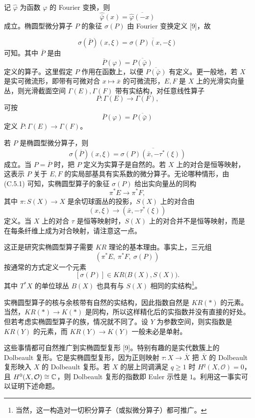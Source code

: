 记 $\hat\varphi$ 为函数 $\varphi$ 的 Fourier 变换，则
\[
  \widehat{\bar\varphi}(x)=\overline{\hat\varphi(-x)}
\]
成立。椭圆型微分算子 $P$ 的象征 $\sigma(P)$ 由 Fourier 变换定义 [9]，故

\[
  \sigma(\overline{P})(x,\xi)=\overline{\sigma(P)(x,-\xi)}
\]
可知。其中 $\overline{P}$ 是由
\[
  \overline{P}(\varphi)=\overline{P(\bar\varphi)}
\]
定义的算子。这里假定 $P$ 作用在函数上，以便 $\overline{P(\bar\varphi)}$ 有定义。更一般地，若 $X$ 是实可微流形，即带有可微对合 $x\mapsto\bar x$ 的可微流形，$E,F$ 是 $X$ 上的光滑实向量丛，则光滑截面空间 $\Gamma(E),\Gamma(F)$ 带有实结构，对任意线性算子
\[
  P\colon\Gamma(E)\to\Gamma(F),
\]
可按
\[
  \overline{P}(\varphi)=\overline{P(\bar\varphi)}
\]
定义 $\overline{P}\colon\Gamma(E)\to\Gamma(F)$。

若 $P$ 是椭圆型微分算子，则
\begin{equation}
  \sigma(\overline{P})(x,\xi)=\overline{\sigma(P)(\bar x,-\tau^{*}(\xi))} \tag{C.5.1}
\end{equation}
成立。当 $P=\overline{P}$ 时，把 $P$ 定义为实算子是自然的。若 $X$ 上的对合是恒等映射，这表示 $P$ 关于 $E,F$ 的实局部基具有实系数的微分算子。无论哪种情形，由 (C.5.1) 可知，实椭圆型算子的象征 $\sigma(P)$ 给出实向量丛的同构
\[
  \pi^{*}E\to\pi^{*}F,
\]
其中 $\pi\colon S(X)\to X$ 是余切球面丛的投影，$S(X)$ 上的对合由
\[
  (x,\xi)\to(\bar x,-\tau^{*}(\xi))
\]
定义。当 $X$ 上的对合 $\tau$ 是恒等映射时，$S(X)$ 上的对合并不是恒等映射，而是在每条纤维上成为对合映射，请注意这一点。

这正是研究实椭圆型算子需要 $KR$ 理论的基本理由。事实上，三元组
\[
  (\pi^{*}E,\ \pi^{*}F,\ \sigma(P))
\]
按通常的方式定义一个元素
\[
  [\sigma(P)]\in KR\bigl(B(X),S(X)\bigr).
\]
其中 $T^{*}X$ 的单位球丛 $B(X)$ 也具有与 $S(X)$ 相同的实结构\footnote{当然，这一构造对一切积分算子（或拟微分算子）都可推广。}。

实椭圆型算子的核与余核带有自然的实结构，因此指数自然是 $KR(*)$ 的元素。当然，$KR(*)\to K(*)$ 是同构，所以这样精化后的实指数并没有直接的好处。但若考虑实椭圆型算子的族，情况就不同了。设 $Y$ 为参数空间，则实指数是 $KR(Y)$ 的元素，而 $KR(Y)\to K(Y)$ 一般未必是单射。

这些事情都可自然推广到实椭圆型复形 [9]。特别有趣的是实代数簇上的 Dolbeault 复形。它是实椭圆型复形，因为正则映射 $\tau\colon X\to\bar X$ 把 $\bar X$ 的 Dolbeault 复形映入 $X$ 的 Dolbeault 复形。若 $X$ 的层上同调满足 $q\ge 1$ 时 $H^{q}(X,\mathcal{O})=0$，且 $H^{0}(X,\mathcal{O})\cong\mathbb{C}$，则 Dolbeault 复形的指数即 Euler 示性是 $1$。利用这一事实可以证明下述命题。

